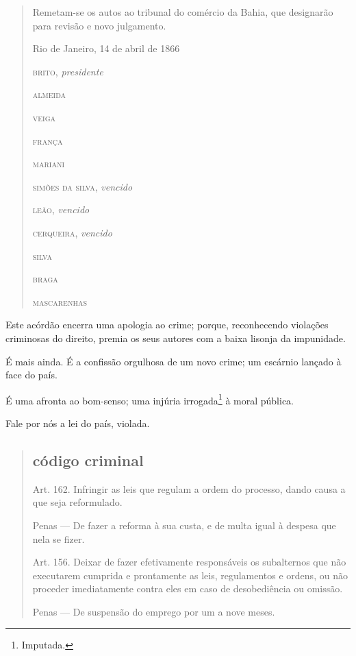 \begin{quote}
Remetam-se os autos ao tribunal do comércio da Bahia, que designarão
para revisão e novo julgamento.

\begin{flushright}
Rio de Janeiro, 14 de abril de 1866


\textsc{brito,} \emph{presidente}

\textsc{almeida}

\textsc{veiga}

\textsc{frança}

\textsc{mariani}

\textsc{simões da silva,} \emph{vencido}

\textsc{leão,} \emph{vencido}

\textsc{cerqueira,} \emph{vencido}

\textsc{silva}

\textsc{braga}

\textsc{mascarenhas}
\end{flushright}
\end{quote}

Este acórdão encerra uma apologia ao crime; porque, reconhecendo
violações criminosas do direito, premia os seus autores com a baixa
lisonja da impunidade.

É mais ainda. É a confissão orgulhosa de um novo crime; um escárnio
lançado à face do país.

É uma afronta ao bom-senso; uma injúria irrogada\footnote{Imputada.} à
moral pública.

Fale por nós a lei do país, violada.

\begin{quote}
\subsection{código criminal}

\forceindent{}Art. 162. Infringir as leis que regulam a ordem do processo, dando causa
a que seja reformulado.

Penas --- De fazer a reforma à sua custa, e de multa igual à despesa que
nela se fizer.

Art. 156. Deixar de fazer efetivamente responsáveis os subalternos que
não executarem cumprida e prontamente as leis, regulamentos e ordens, ou
não proceder imediatamente contra eles em caso de desobediência ou
omissão.

Penas --- De suspensão do emprego por um a nove meses.
\end{quote}

